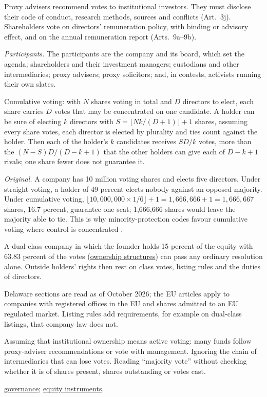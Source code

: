 \begin{qfdefinition}
Proxy advisers recommend votes to institutional investors. They must disclose their code of conduct, research methods, sources and conflicts (Art.~3j). Shareholders vote on directors' remuneration policy, with binding or advisory effect, and on the annual remuneration report (Arts.~9a--9b).

\emph{Participants.} The participants are the company and its board, which set the agenda; shareholders and their investment managers; custodians and other intermediaries; proxy advisers; proxy solicitors; and, in contests, activists running their own slates.

 Cumulative voting: with $N$ shares voting in total and $D$ directors to elect, each share carries $D$ votes that may be concentrated on one candidate. A holder can be sure of electing $k$ directors with $S=\lfloor Nk/(D+1)\rfloor+1$ shares, assuming every share votes, each director is elected by plurality and ties count against the holder. Then each of the holder's $k$ candidates receives $SD/k$ votes, more than the $(N-S)D/(D-k+1)$ that the other holders can give each of $D-k+1$ rivals; one share fewer does not guarantee it.

 \emph{Original.} A company has 10 million voting shares and elects five directors. Under straight voting, a holder of 49 percent elects nobody against an opposed majority. Under cumulative voting, $\lfloor10{,}000{,}000\times1/6\rfloor+1=1{,}666{,}666+1=1{,}666{,}667$ shares, 16.7 percent, guarantee one seat; 1,666,666 shares would leave the majority able to tie. This is why minority-protection codes favour cumulative voting where control is concentrated \citep[principle~II.G, p.~21]{oecd-g20-principles-2023}.

A dual-class company in which the founder holds 15 percent of the equity with 63.83 percent of the votes (\hyperref[def:global-ownership-structures]{ownership structures}) can pass any ordinary resolution alone. Outside holders' rights then rest on class votes, listing rules and the duties of directors.

 Delaware sections are read as of October 2026; the EU articles apply to companies with registered offices in the EU and shares admitted to an EU regulated market. Listing rules add requirements, for example on dual-class listings, that company law does not.

 Assuming that institutional ownership means active voting: many funds follow proxy-adviser recommendations or vote with management. Ignoring the chain of intermediaries that can lose votes. Reading ``majority vote'' without checking whether it is of shares present, shares outstanding or votes cast.

 \hyperref[meth:corporate-governance-evaluation]{governance}; \hyperref[def:equity-instruments]{equity instruments}.

\end{qfdefinition}

